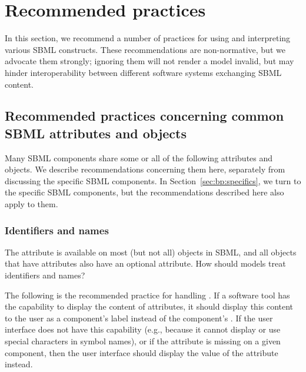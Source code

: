 
\section{Recommended practices}
\label{sec:best-practices}

In this section, we recommend a number of practices for using and
interpreting various SBML constructs.  These recommendations are
non-normative, but we advocate them strongly; ignoring them will
not render a model invalid, but may hinder interoperability
between different software systems exchanging SBML content.


\subsection{Recommended practices concerning common SBML
  attributes and objects}
\label{sec:bp:common}

Many SBML components share some or all of the following attributes
and objects.  We describe recommendations concerning them here,
separately from discussing the specific SBML components.  In
Section~\ref{sec:bp:specifics}, we turn to the specific SBML
components, but the recommendations described here also apply to
them.


\subsubsection{Identifiers and names}
\label{sec:bp:names}

The  attribute is available on most (but not all)
objects in SBML, and all objects that have  attributes
also have an optional  attribute.  How should models
treat identifiers and names?

The following is the recommended practice for handling
.  If a software tool has the capability to
display the content of  attributes, it should
display this content to the user as a component's label instead of
the component's .  If the user interface does not have
this capability (e.g., because it cannot display or use special
characters in symbol names), or if the  attribute is
missing on a given component, then the user interface should
display the value of the  attribute instead.

